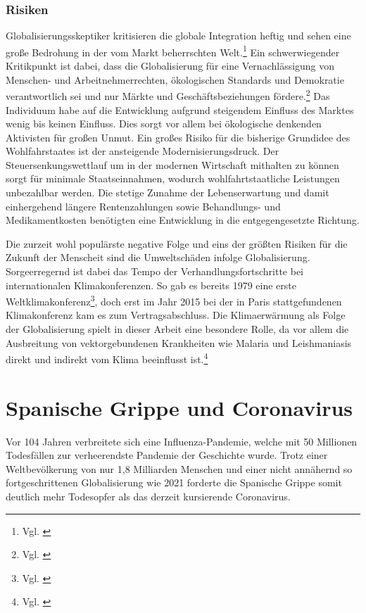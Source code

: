 \documentclass[12pt]{article}
\begin{document}
\subsubsection{Risiken}
Globalisierungsskeptiker kritisieren die globale Integration heftig und sehen eine große Bedrohung in der vom Markt beherrschten Welt.\footnote{Vgl. \cite{Renz2001}} Ein schwerwiegender Kritikpunkt ist dabei, dass die Globalisierung für eine Vernachlässigung von Menschen- und Arbeitnehmerrechten, ökologischen Standards und Demokratie verantwortlich sei und nur Märkte und Geschäftsbeziehungen fördere.\footnote{Vgl. \cite{IntGB2010}} Das Individuum habe auf die Entwicklung aufgrund steigendem Einfluss des Marktes wenig bis keinen Einfluss. Dies sorgt vor allem bei ökologische denkenden Aktivisten für großen Unmut.
Ein großes Risiko für die bisherige Grundidee des Wohlfahrstaates ist der ansteigende Modernisierungsdruck. Der Steuersenkungswettlauf um in der modernen Wirtschaft mithalten zu können sorgt für minimale Staatseinnahmen, wodurch wohlfahrtstaatliche Leistungen unbezahlbar werden. Die stetige Zunahme der Lebenserwartung und damit einhergehend längere Rentenzahlungen sowie Behandlungs- und Medikamentkosten benötigten eine Entwicklung in die entgegengesetzte Richtung.

Die zurzeit wohl populärste negative Folge und eins der größten Risiken für die Zukunft der Menscheit sind die Umweltschäden infolge Globalisierung. Sorgeerregernd ist dabei das Tempo der Verhandlungsfortschritte bei internationalen Klimakonferenzen. So gab es bereits 1979 eine erste Weltklimakonferenz\footnote{Vgl. \cite{Weltklimakonferenzen}}, doch erst im Jahr 2015 bei der in Paris stattgefundenen Klimakonferenz kam es zum Vertragsabschluss. Die Klimaerwärmung als Folge der Globalisierung spielt in dieser Arbeit eine besondere Rolle, da vor allem die Ausbreitung von vektorgebundenen Krankheiten wie Malaria und Leishmaniasis direkt und indirekt vom Klima beeinflusst ist.\footnote{Vgl. \cite{Ebert2005}}

\section{Spanische Grippe und Coronavirus}
Vor 104 Jahren verbreitete sich eine Influenza-Pandemie, welche mit 50 Millionen Todesfällen zur verheerendste Pandemie der Geschichte wurde. %
Trotz einer Weltbevölkerung von nur 1,8 Milliarden Menschen und einer nicht annähernd so fortgeschrittenen Globalisierung wie 2021 forderte die Spanische Grippe somit deutlich mehr Todesopfer als das derzeit kursierende Coronavirus.
\end{document}
